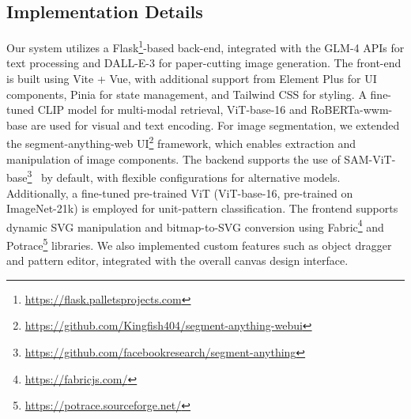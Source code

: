 \subsection{Implementation Details}
Our system utilizes a Flask\footnote{\url{https://flask.palletsprojects.com}}-based back-end, integrated with the GLM-4 APIs for text processing and DALL-E-3 for paper-cutting image generation. The front-end is built using Vite + Vue, with additional support from Element Plus for UI components, Pinia for state management, and Tailwind CSS for styling.
A fine-tuned CLIP model for multi-modal retrieval, ViT-base-16 and RoBERTa-wwm-base are used for visual and text encoding.
For image segmentation, we extended the segment-anything-web UI\footnote{\url{https://github.com/Kingfish404/segment-anything-webui}} framework, which enables extraction and manipulation of image components. The backend supports the use of SAM-ViT-base\footnote{\url{https://github.com/facebookresearch/segment-anything}}~\cite{Kirillov:2023:sam} by default, with flexible configurations for alternative models.
Additionally, a fine-tuned pre-trained ViT (ViT-base-16, pre-trained on ImageNet-21k) is employed for unit-pattern classification.
The frontend supports dynamic SVG manipulation and bitmap-to-SVG conversion using Fabric\footnote{\url{https://fabricjs.com/}} and Potrace\footnote{\url{https://potrace.sourceforge.net/}} libraries. We also implemented custom features such as object dragger and pattern editor, integrated with the overall canvas design interface. 